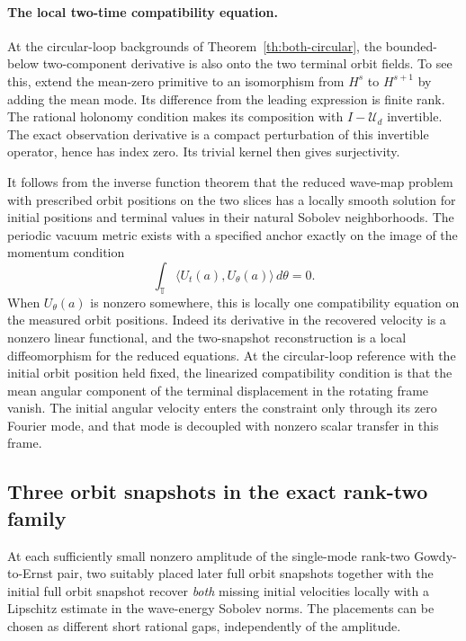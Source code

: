 \paragraph{The local two-time compatibility equation.}
At the circular-loop backgrounds of
Theorem~\ref{th:both-circular}, the bounded-below
two-component derivative is also onto the two
terminal orbit fields. To see this, extend the
mean-zero primitive to an isomorphism from $H^s$
to $H^{s+1}$ by adding the mean mode.
Its difference from the leading expression is
finite rank. The rational holonomy condition
makes its composition with $I-\mathcal U_d$
invertible. The exact observation derivative is
a compact perturbation of this invertible
operator, hence has index zero.
Its trivial kernel then gives surjectivity.

It follows from the inverse function theorem that
the reduced wave-map problem with prescribed orbit
positions on the two slices has a locally smooth
solution for initial positions and terminal values
in their natural Sobolev neighborhoods.
The periodic vacuum metric exists with a specified
anchor exactly on the image of the momentum condition
\[
 \int_{\mathbb T}\langle U_t(a),U_\theta(a)\rangle\,d\theta=0 .
\]
When $U_\theta(a)$ is nonzero somewhere, this is
locally one compatibility equation on the measured
orbit positions. Indeed its derivative in the recovered
velocity is a nonzero linear functional, and the
two-snapshot reconstruction is a local diffeomorphism
for the reduced equations. At the circular-loop
reference with the initial orbit position held fixed,
the linearized compatibility condition is that the
mean angular component of the terminal displacement
in the rotating frame vanish. The initial angular
velocity enters the constraint only through its
zero Fourier mode, and that mode is decoupled
with nonzero scalar transfer in this frame.

\subsection{Three orbit snapshots in the exact rank-two family}

\begin{theorem}
\label{th:both-ernst}
At each sufficiently small nonzero amplitude of the
single-mode rank-two Gowdy-to-Ernst pair, two suitably
placed later full orbit snapshots together with the
initial full orbit snapshot recover \emph{both} missing
initial velocities locally with a Lipschitz estimate
in the wave-energy Sobolev norms. The placements
can be chosen as different short rational gaps,
independently of the amplitude.
\end{theorem}

